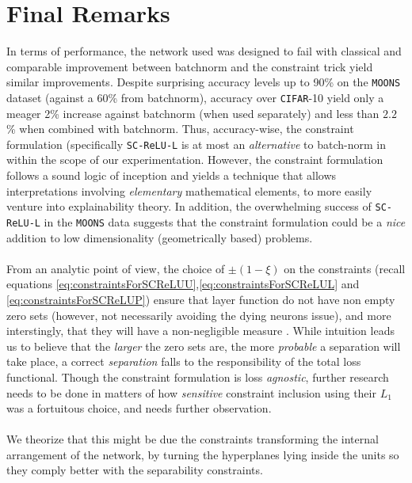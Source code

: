 \section{Final Remarks}\label{sec:finalRemarks}

In terms of performance, the network used was designed to fail with classical \ReLU and comparable improvement between batchnorm and the constraint trick yield similar improvements. Despite surprising accuracy levels up to 90\% on the \texttt{MOONS} dataset (against a 60\% from batchnorm), accuracy over \texttt{CIFAR}-10 yield only a meager 2\% increase against batchnorm (when used separately) and less than $2.2$\% when combined with batchnorm. Thus, accuracy-wise, the constraint formulation (specifically \texttt{SC-ReLU-L} is at most an \emph{alternative} to batch-norm in within the scope of our experimentation. However, the constraint formulation follows a sound logic of inception and yields a technique that allows interpretations involving \emph{elementary} mathematical elements, to more easily venture into explainability theory. In addition, the overwhelming success of \texttt{SC-ReLU-L} in the \texttt{MOONS} data suggests that the constraint formulation could be a \emph{nice} addition to low dimensionality (geometrically based) problems. 
\\\\
From an analytic point of view, the choice of $\pm(1-\xi)$ on the constraints (recall equations \ref{eq:constraintsForSCReLUU},\ref{eq:constraintsForSCReLUL} and \ref{eq:constraintsForSCReLUP}) ensure that layer function do not have non empty zero sets (however, not necessarily avoiding the dying neurons issue), and more interstingly, that they will have a non-negligible measure \cite{florenzano2001ConvexAnalysis}. While intuition leads us to believe that the \emph{larger} the zero sets are, the more \emph{probable} a separation will take place, a correct \emph{separation} falls to the responsibility of the total loss functional. Though the constraint formulation is loss \emph{agnostic}, further research needs to be done in matters of how \emph{sensitive} constraint inclusion using their $L_1$ was a fortuitous choice, and needs further observation.
\\\\
We theorize that this might be due the constraints transforming the internal arrangement of the network, by turning the hyperplanes lying inside the units so they comply better with the separability constraints.        
\\\\
